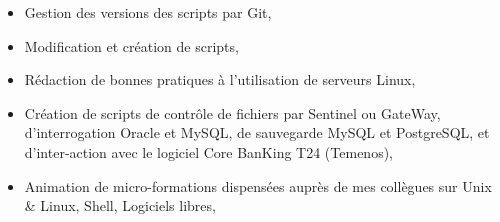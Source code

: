 {\begin{itemize}
\begin{itemize}
                \item{Gestion des versions des scripts par Git,}
                \item{Modification et création de scripts,}
                \item{Rédaction de bonnes pratiques à l'utilisation de serveurs Linux,}
                \item{Création de scripts de contrôle de fichiers par Sentinel ou GateWay, d'interrogation Oracle et MySQL, de sauvegarde MySQL et PostgreSQL, et d'inter-action avec le logiciel Core BanKing T24 (Temenos),}
                \item{Animation de micro-formations dispensées auprès de mes collègues sur Unix \& Linux, Shell, Logiciels libres,}
            \end{itemize}
    \end{itemize}
}

